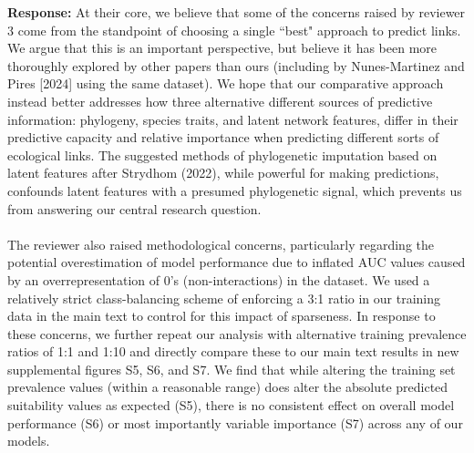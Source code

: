 \documentclass{article}
\begin{document}
\textbf{Response:} At their core, we believe that some of the concerns raised by reviewer 3 come from the standpoint of choosing a single ``best" approach to predict links. We argue that this is an important perspective, but believe it has been more thoroughly explored by other papers than ours (including by Nunes-Martinez and Pires [2024]\cite{nunes2024estimated} using the same dataset). We hope that our comparative approach instead better addresses how three alternative different sources of predictive information: phylogeny, species traits, and latent network features, differ in their predictive capacity and relative importance when predicting different sorts of ecological links. The suggested methods of phylogenetic imputation based on latent features after Strydhom (2022)\cite{strydom2022food}, while powerful for making predictions, confounds latent features with a presumed phylogenetic signal, which prevents us from answering our central research question.

\paragraph{}
The reviewer also raised methodological concerns, particularly regarding the potential overestimation of model performance due to inflated AUC values caused by an overrepresentation of 0’s (non-interactions) in the dataset. We used a relatively strict class-balancing scheme of enforcing a 3:1 ratio in our training data in the main text to control for this impact of sparseness. In response to these concerns, we further repeat our analysis with alternative training prevalence ratios of 1:1 and 1:10 and directly compare these to our main text results in new supplemental figures S5, S6, and S7. We find that while altering the training set prevalence values (within a reasonable range) does alter the absolute predicted suitability values as expected (S5), there is no consistent effect on overall model performance (S6) or most importantly variable importance (S7) across any of our models. 
\end{document}

